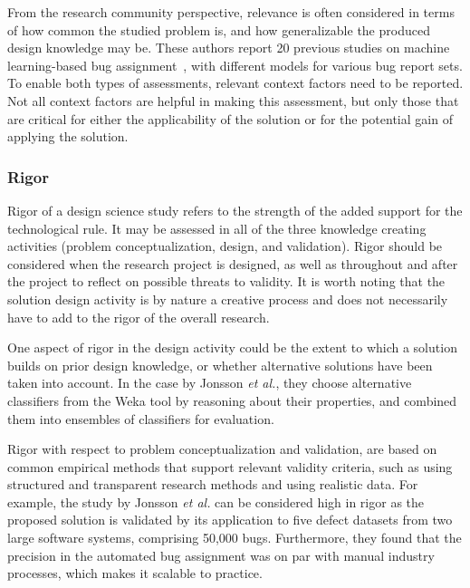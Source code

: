 \documentclass[graybox]{svmult}
\begin{document}
From the research community perspective, relevance is often considered in terms of how common the studied problem is, and how generalizable the produced design knowledge may be. These authors report 20 previous studies on machine learning-based bug assignment~\cite[Fig.2]{JonssonBug15}, with different models for various bug report sets. To enable both types of assessments, relevant context factors need to be reported. Not all context factors are helpful in making this assessment, but only those that are critical for either the applicability of the solution or for the potential gain of applying the solution. 


\subsubsection{Rigor} 
Rigor of a design science study refers to the strength of the added support for the technological rule. It may be assessed in all of the three knowledge creating activities (problem conceptualization, design, and validation). 
Rigor should be considered when the research project is designed, as well as throughout and after the project to reflect on possible threats to validity. 
It is worth noting that the solution design activity is by nature a creative process and does not necessarily have to add to the rigor of the overall research. 

One aspect of rigor in the design activity could be the extent to which a solution builds on prior design knowledge, or whether alternative solutions have been taken into account. 
In the case by Jonsson \emph{et al.}, they choose alternative classifiers from the Weka tool by reasoning about their properties, and combined them into ensembles of classifiers for evaluation.

Rigor with respect to problem conceptualization and validation, are based on common empirical methods that support relevant validity criteria, such as using structured and transparent research methods and using realistic data. For example, the study by Jonsson \emph{et al.} can be considered high in rigor as the proposed solution is validated by its application to five defect datasets from two large software systems, comprising 50,000 bugs. Furthermore, they found that the precision in the automated bug assignment was on par with manual industry processes, which makes it scalable to practice.
\end{document}
